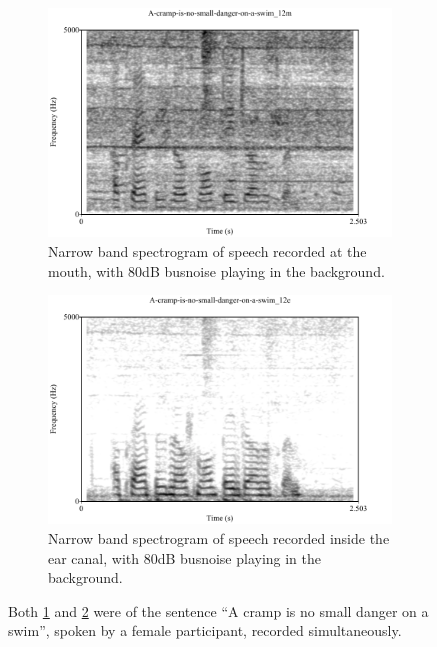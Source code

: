 \begin{figure}
\centering
\begin{subfigure}{0.475\textwidth}
  \centering
  \includegraphics[width=1\linewidth]{figure/spctgrmNarrowMthNoise_35.pdf}
  \caption{Narrow band spectrogram of speech recorded at the mouth, with 80dB \DIFdelbeginFL {}\DIFdelendFL \DIFaddbeginFL {}\DIFaddendFL bus\DIFdelbeginFL {}\DIFdelendFL \DIFaddbeginFL {}\DIFaddendFL noise playing in the background.}
  \label{spctgrmNarrowMouthNoise_35}
\end{subfigure}%
\hfill
\begin{subfigure}{0.475\textwidth}
  \centering
  \includegraphics[width=1\linewidth]{figure/spctgrmNarrowEarNoise_35.pdf}
  \caption{Narrow band spectrogram of speech recorded inside the ear canal, with 80dB \DIFdelbeginFL {}\DIFdelendFL \DIFaddbeginFL {}\DIFaddendFL bus\DIFdelbeginFL {}\DIFdelendFL \DIFaddbeginFL {}\DIFaddendFL noise playing in the background.}
  \label{spctgrmNarrowEarNoise_35}
\end{subfigure}
\caption{Both \ref{spctgrmNarrowMouthNoise_35} and \ref{spctgrmNarrowEarNoise_35} were of the sentence ``A cramp is no small danger on a swim'', spoken by a female participant, recorded simultaneously.}
\label{fig:noise_mth_ear}
\end{figure}


